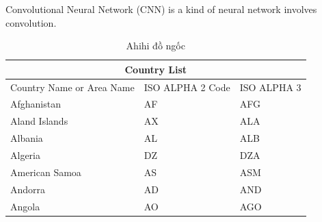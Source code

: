 Convolutional Neural Network (CNN) is a kind of neural network involves convolution. 

\begin{table}
\centering
\begin{tabular}{ |p{3cm}|p{3cm}|p{3cm}|  }
\hline
\multicolumn{3}{|c|}{Country List} \\
\hline
Country Name     or Area Name& ISO ALPHA 2 Code &ISO ALPHA 3 \\
\hline
Afghanistan & AF &AFG \\
Aland Islands & AX   & ALA \\
Albania &AL & ALB \\
Algeria    &DZ & DZA \\
American Samoa & AS & ASM \\
Andorra & AD & AND   \\
Angola & AO & AGO \\
\hline
\end{tabular}
\caption{Ahihi đồ ngốc}
  \label{tab:11}
  \end{table}